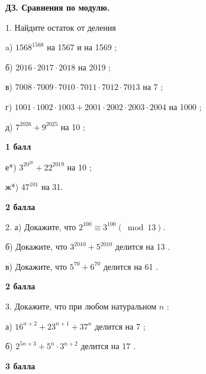 \centerline{\bf \Huge ДЗ. Сравнения по модулю.} 


1. Найдите остаток от деления

a) $1568^{1568}$ на 1567 и на 1569 ;

б) $2016 \cdot 2017 \cdot 2018$ на 2019 ;

в) $7008 \cdot 7009 \cdot 7010 \cdot 7011 \cdot 7012 \cdot 7013$ на 7 ;

г) $1001 \cdot 1002 \cdot 1003+2001 \cdot 2002 \cdot 2003 \cdot 2004$ на 1000 ;

д) $7^{2026}+9^{2025}$ на 10 ;

\begin{flushright} \textbf{1 балл}\\ 
\end{flushright}

е*) $3^{20^{20}}+22^{2019}$ на 10 ;

ж*) $47^{101}$ на 31.

\begin{flushright} \textbf{2 балла}\\ 
\end{flushright}

2. а) Докажите, что $2^{100} \equiv 3^{100}(\bmod 13)$.

б) Докажите, что $3^{2010}+5^{2010}$ делится на 13 .

в) Докажите, что $5^{70}+6^{70}$ делится на 61 .

\begin{flushright} \textbf{2 балла}\\ 
\end{flushright}

3. Докажите, что при любом натуральном $n$ :

а) $16^{n+2}+23^{n+1}+37^n$ делится на 7 ;

б) $2^{5 n+3}+5^n \cdot 3^{n+2}$ делится на 17 .

\begin{flushright} \textbf{3 балла}\\ 
\end{flushright}
